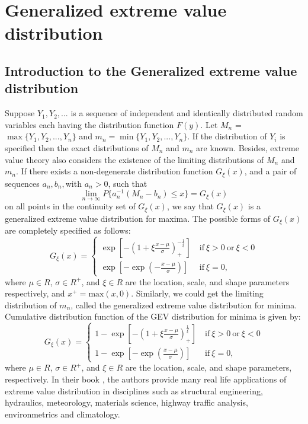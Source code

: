 \documentclass[smallextended]{svjour3}       %
\begin{document}
\section{Generalized extreme value distribution}

\subsection{Introduction to the Generalized extreme value distribution}
\label{sec:gev}
Suppose $Y_{1},Y_{2},...$ is a sequence of independent and identically
distributed random variables each having the distribution function
$F(y)$. Let $M_{n}$ = $\max\{Y_{1},Y_{2},...,Y_{n}\}$ and $m_{n}=\min\{Y_{1},Y_{2},...,Y_{n}\}$.
If the distribution of $Y_{i}$ is specified then the exact distributions
of $M_{n}$ and $m_{n}$ are known. Besides, extreme value theory
also considers the existence of the limiting distributions of $M_{n}$
and $m_{n}$. If there exists a non-degenerate distribution function
$G_{\xi}(x)$, and a pair of sequences ${a_{n}},{b_{n}},$with $a_{n}>0$,
such that
\begin{equation}
\lim_{n\rightarrow\infty}P\{a_{n}^{-1}(M_{n}-b_{n})\leq x\}=G_{\xi}(x)
\end{equation}
on all points in the continuity set of $G_{\xi}(x)$, we say that
$G_{\xi}(x)$ is a generalized extreme value distribution for maxima.
The possible forms of $G_{\xi}(x)$ are completely specified as follows:
\[
G_{\xi}(x)=\begin{cases}
\exp[-(1+\xi\frac{x-\mu}{\sigma})_{+}^{-\frac{1}{\xi}}] & \ \mbox{if}\ \xi>0\ \mbox{or}\ \xi<0\\
\exp[-\exp(-\frac{x-\mu}{\sigma})] & \ \mbox{if}\ \xi=0,
\end{cases}
\]
where $\mu\in R$, $\sigma\in R^{+}$, and $\xi\in R$ are the location,
scale, and shape parameters respectively, and $x^{+}=\mbox{max}(x,0)$.
Similarly, we could get the limiting distribution of $m_{n}$, called
the generalized extreme value distribution for minima.
Cumulative distribution function of the GEV distribution for minima
is given by:
\[
G_{\xi}(x)=\begin{cases}
1-\exp[-(1+\xi\frac{x-\mu}{\sigma})_{+}^{\frac{1}{\xi}}] & \ \mbox{if}\ \xi>0\ \mbox{or}\ \xi<0\\
1-\exp[-\exp(\frac{x-\mu}{\sigma})] & \ \mbox{if}\ \xi=0,
\end{cases}
\]
where $\mu\in R$, $\sigma\in R^{+}$, and $\xi\in R$ are the location,
scale, and shape parameters, respectively.
In their book \citet{castillo:hadi:2004}, the authors provide many real life applications of extreme value distribution in disciplines such as structural engineering, hydraulics, meteorology, materials science, highway traffic analysis, environmetrics and climatology. 
\end{document}
